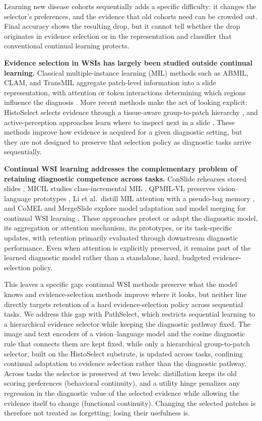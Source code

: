 \documentclass{article}
\begin{document}
Learning new disease cohorts sequentially adds a specific difficulty: it changes the selector's preferences, and the evidence that old cohorts need can be crowded out. Final accuracy shows the resulting drop, but it cannot tell whether the drop originates in evidence selection or in the representation and classifier that conventional continual learning protects.

\textbf{Evidence selection in WSIs has largely been studied outside continual learning.} Classical multiple-instance learning (MIL) methods such as ABMIL, CLAM, and TransMIL aggregate patch-level information into a slide representation, with attention or token interactions determining which regions influence the diagnosis \cite{ilse2018abmil,lu2021clam,shao2021transmil}. More recent methods make the act of looking explicit: HistoSelect selects evidence through a tissue-aware group-to-patch hierarchy \cite{huang2026histoselect}, and active-perception approaches learn where to inspect next in a slide \cite{chen2026adaptivepath}. These methods improve how evidence is acquired for a given diagnostic setting, but they are not designed to preserve that selection policy as diagnostic tasks arrive sequentially.

\textbf{Continual WSI learning addresses the complementary problem of retaining diagnostic competence across tasks.} ConSlide rehearses stored slides \cite{huang2023conslide}, MICIL studies class-incremental MIL \cite{meseguer2024micil}, QPMIL-VL preserves vision--language prototypes \cite{gou2025qpmil}, Li et al.\ distill MIL attention with a pseudo-bag memory \cite{li2025akd}, and CoMEL and MergeSlide explore model adaptation and model merging for continual WSI learning \cite{lee2025comel,bui2026mergeslide}. These approaches protect or adapt the diagnostic model, its aggregation or attention mechanism, its prototypes, or its task-specific updates, with retention primarily evaluated through downstream diagnostic performance. Even when attention is explicitly preserved, it remains part of the learned diagnostic model rather than a standalone, hard, budgeted evidence-selection policy.

This leaves a specific gap: continual WSI methods preserve what the model knows and evidence-selection methods improve where it looks, but neither line directly targets retention of a hard evidence-selection policy across sequential tasks. We address this gap with PathSelect, which restricts sequential learning to a hierarchical evidence selector while keeping the diagnostic pathway fixed. The image and text encoders of a vision--language model and the cosine diagnostic rule that connects them are kept fixed, while only a hierarchical group-to-patch selector, built on the HistoSelect substrate, is updated across tasks, confining continual adaptation to evidence selection rather than the diagnostic pathway. Across tasks the selector is preserved at two levels: distillation keeps its old scoring preferences (behavioral continuity), and a utility hinge penalizes any regression in the diagnostic value of the selected evidence while allowing the evidence itself to change (functional continuity). Changing the selected patches is therefore not treated as forgetting; losing their usefulness is.
\end{document}

